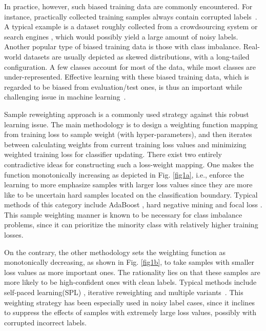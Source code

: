\documentclass{article}
\begin{document}
	In practice, however, such biased training data are commonly encountered. For instance, practically collected training samples always contain corrupted labels~\cite{sukhbaatar2014learning,azadi2015auxiliary,goldberger2016training,li2017learning,vahdat2017toward,hendrycks2018using,han2018co,zhang2018generalized}. A typical example is a dataset roughly collected from a crowdsourcing system \cite{bi2014learning} or search engines \cite{liang2016learning,zhuang2017attend}, which would possibly yield a large amount of noisy labels.
	Another popular type of biased training data is those with class imbalance. Real-world datasets are usually depicted as skewed distributions, with a long-tailed configuration. A few classes account for most of the data, while most classes are under-represented. Effective learning with these biased training data, which is regarded to be biased from evaluation/test ones, is thus an important while challenging issue in machine learning~\cite{ren2018learning,jiang2018mentornet}.
	
	Sample reweighting approach is a commonly used strategy against this robust learning issue. The main methodology is to design a weighting function mapping from training loss to sample weight (with hyper-parameters), and then iterates between calculating weights from current training loss values and minimizing weighted training loss for classifier updating. There exist two entirely contradictive ideas for constructing such a loss-weight mapping. One makes the function monotonically increasing as depicted in Fig. \ref{fig1a}, i.e., enforce the learning to more emphasize samples with larger loss values since they are more like to be uncertain hard samples located on the classification boundary. Typical methods of this category include AdaBoost \cite{freund1997decision,sun2007cost}, hard negative mining \cite{malisiewicz2011ensemble} and focal loss \cite{lin2018focal}. This sample weighting manner is known to be necessary for class imbalance problems, since it can prioritize the minority class with relatively higher training losses.
	
	On the contrary, the other methodology sets the weighting function as monotonically decreasing, as shown in Fig. \ref{fig1b}, to take samples with smaller loss values as more important ones. The rationality lies on that these samples are more likely to be high-confident ones with clean labels. Typical methods include self-paced learning(SPL) \cite{kumar2010self}, iterative reweighting \cite{fernando2003reweight,zhang2018generalized} and multiple variants~\cite{jiang2014easy,jiang2014self,wang2017robust}. This weighting strategy has been especially used in noisy label cases, since it inclines to suppress the effects of samples with extremely large loss values, possibly with corrupted incorrect labels.
	
\end{document}
